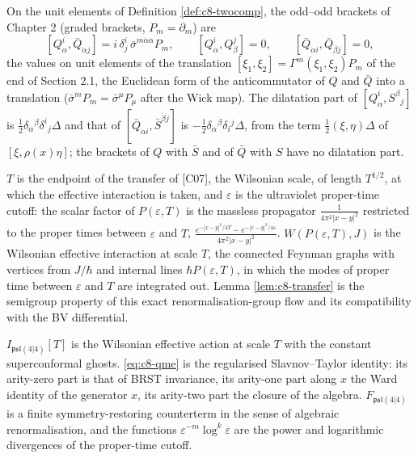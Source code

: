 \begin{remark}
On the unit elements of Definition \ref{def:c8-twocomp}, the odd--odd brackets of Chapter 2 (graded brackets, $P_m=\partial_m$) are
\[
[Q^i_\alpha,\bar Q_{\dot\alpha j}]=i\,\delta^i_j\,\bar\sigma^{m\dot\alpha\alpha}P_m,\qquad [Q^i_\alpha,Q^j_\beta]=0,\qquad [\bar Q_{\dot\alpha i},\bar Q_{\dot\beta j}]=0,
\]
the values on unit elements of the translation $[\xi_1,\xi_2]=\Gamma^m(\xi_1,\xi_2)P_m$ of the end of Section 2.1, the Euclidean form of the anticommutator of $Q$ and $\bar Q$ into a translation ($\bar\sigma^mP_m=\bar\sigma^\mu P_\mu$ after the Wick map). The dilatation part of $[Q^i_\alpha,S^\beta{}_j]$ is $\tfrac12\delta_\alpha{}^\beta\delta^i{}_j\Delta$ and that of $[\bar Q_{\dot\alpha i},\bar S^{\dot\beta j}]$ is $-\tfrac12\delta_{\dot\alpha}{}^{\dot\beta}\delta_i{}^j\Delta$, from the term $\tfrac12(\xi,\eta)\Delta$ of $[\xi,\rho(x)\eta]$; the brackets of $Q$ with $\bar S$ and of $\bar Q$ with $S$ have no dilatation part.
\end{remark}

\begin{remark}
$T$ is the endpoint of the transfer of [C07], the Wilsonian scale, of length $T^{1/2}$, at which the effective interaction is taken, and $\varepsilon$ is the ultraviolet proper-time cutoff: the scalar factor of $P(\varepsilon,T)$ is the massless propagator $\frac1{4\pi^2|x-y|^2}$ restricted to the proper times between $\varepsilon$ and $T$, $\frac{e^{-|x-y|^2/4T}-e^{-|x-y|^2/4\varepsilon}}{4\pi^2|x-y|^2}$. $W(P(\varepsilon,T),J)$ is the Wilsonian effective interaction at scale $T$, the connected Feynman graphs with vertices from $J/\hbar$ and internal lines $\hbar P(\varepsilon,T)$, in which the modes of proper time between $\varepsilon$ and $T$ are integrated out. Lemma \ref{lem:c8-transfer} is the semigroup property of this exact renormalisation-group flow and its compatibility with the BV differential.
\end{remark}

\begin{remark}
$I_{\mathfrak{psl}(4|4)}[T]$ is the Wilsonian effective action at scale $T$ with the constant superconformal ghosts. \eqref{eq:c8-qme} is the regularised Slavnov--Taylor identity: its arity-zero part is that of BRST invariance, its arity-one part along $x$ the Ward identity of the generator $x$, its arity-two part the closure of the algebra. $F_{\mathfrak{psl}(4|4)}$ is a finite symmetry-restoring counterterm in the sense of algebraic renormalisation, and the functions $\varepsilon^{-m}\log^k\varepsilon$ are the power and logarithmic divergences of the proper-time cutoff.
\end{remark}

